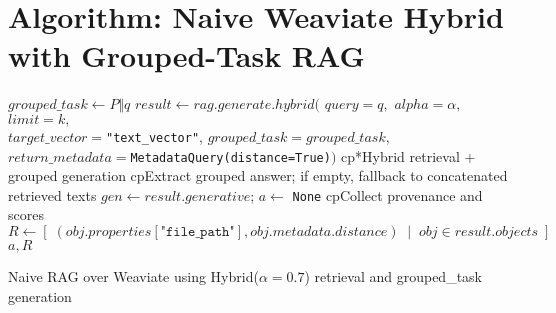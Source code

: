 \section{Algorithm: Naive Weaviate Hybrid with Grouped-Task RAG}\label{alg:naive-weaviate-hybrid}
\begin{algorithm}[H]
  \DontPrintSemicolon
  \BlankLine
  $grouped\_task \leftarrow P \Vert q$ 
  $result \leftarrow rag.generate.hybrid($
    $query{=}q,$ $alpha{=}\alpha,$ $limit{=}k,$\\
    $target\_vector{=}$\texttt{"text\_vector"}, $grouped\_task{=}grouped\_task,$\\
    $return\_metadata{=}$\texttt{MetadataQuery(distance=True)}$)$
  	cp*{Hybrid retrieval + grouped generation}
  \BlankLine
  	cp{Extract grouped answer; if empty, fallback to concatenated retrieved texts}
  $gen \leftarrow result.generative$; $a \leftarrow$ \texttt{None}\;
  \BlankLine
  	cp{Collect provenance and scores}
  $R \leftarrow [\; (obj.properties[\texttt{"file\_path"}], obj.metadata.distance) \;\mid\; obj \in result.objects\; ]$\;
  \BlankLine
  \Return $a, R$\;
  \caption{Naive RAG over Weaviate using Hybrid($\alpha{=}0.7$) retrieval and grouped\_task generation}
\end{algorithm}


